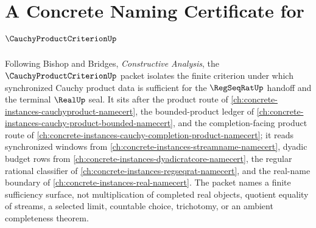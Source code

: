\chapter{A Concrete Naming Certificate for $\CauchyProductCriterionUp$}
\label{ch:concrete-instances-cauchy-product-criterion-namecert}

Following Bishop and Bridges, \emph{Constructive Analysis}, the $\CauchyProductCriterionUp$ packet isolates the finite criterion under which synchronized Cauchy product data is sufficient for the $\RegSeqRatUp$ handoff and the terminal $\RealUp$ seal. It sits after the product route of \autoref{ch:concrete-instances-cauchyproduct-namecert}, the bounded-product ledger of \autoref{ch:concrete-instances-cauchy-product-bounded-namecert}, and the completion-facing product route of \autoref{ch:concrete-instances-cauchy-completion-product-namecert}; it reads synchronized windows from \autoref{ch:concrete-instances-streamname-namecert}, dyadic budget rows from \autoref{ch:concrete-instances-dyadicratcore-namecert}, the regular rational classifier of \autoref{ch:concrete-instances-regseqrat-namecert}, and the real-name boundary of \autoref{ch:concrete-instances-real-namecert}. The packet names a finite sufficiency surface, not multiplication of completed real objects, quotient equality of streams, a selected limit, countable choice, trichotomy, or an ambient completeness theorem.

